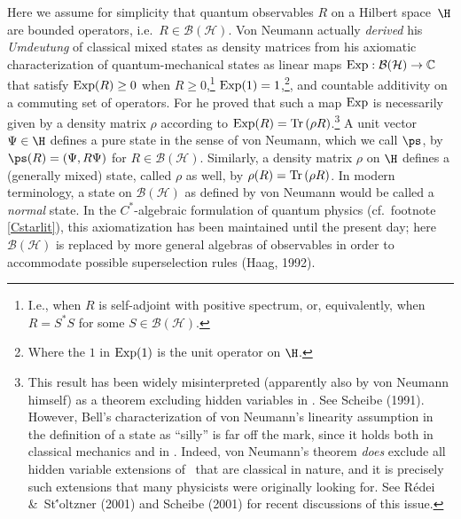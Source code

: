 \documentclass[12pt]{article}
\newcommand{\ca}{$C^*$-algebra} \newcommand{\jba}{JB-algebra}
\newcommand{\Hs}{Hilbert space} \newcommand{\Bs}{Banach space}
\newcommand{\raw}{\rightarrow} \newcommand{\rat}{\mapsto}
\newcommand{\Tr}{\mbox{\rm Tr}\,} \newcommand{\Ad}{{\rm Ad}}
\newcommand{\BH}{\mathcal{B}({\mathcal H})} \newcommand{\diri}{\int^{\oplus}}
\newcommand{\Exp}{{\rm Exp}}
\newcommand{\rh}{\rho} \newcommand{\sg}{\sigma}
\newcommand{\C}{{\mathbb C}} \newcommand{\D}{{\mathbb D}}
\begin{document}
Here we  assume for simplicity that 
 quantum observables $R$ on a \Hs\ $\H$ are bounded operators, i.e.\ $R\in\BH$. Von Neumann actually {\it derived} his {\it Umdeutung} of classical mixed states as density matrices from his axiomatic characterization of quantum-mechanical states as  linear maps $\Exp: \BH\raw \C$  that satisfy $\Exp(R)\geq 0$ when $R\geq 0$,\footnote{I.e., when $R$ is self-adjoint with positive spectrum, or, equivalently, when $R=S^*S$ for some $S\in \BH$.} $\Exp(1)=1$,\footnote{Where the $1$ in $\Exp(1)$ is the unit operator on $\H$.},  and countable additivity on a commuting set of operators. For he proved that such a map $\Exp$ is necessarily given by a density matrix $\rh$ according to $\Exp(R)=\Tr(\rh R)$.\footnote{This result has been widely misinterpreted (apparently also by von Neumann himself) as a theorem excluding hidden variables in \qm. See Scheibe (1991).  However, Bell's characterization of von Neumann's linearity assumption in the definition of a state as ``silly'' is far off the mark, since it holds  both in classical mechanics and in \qm.  Indeed, von Neumann's theorem {\it does} exclude all hidden variable extensions of \qm\ that are classical in nature, and it is precisely such extensions that many physicists were originally looking for. See R\'{e}dei \&\ St\''{o}ltzner (2001) and Scheibe (2001) 
for  recent discussions of this issue.} 
A unit vector $\Psi\in\H$ defines a pure state in the sense of von Neumann, which we call $\ps$, by $\ps(R)=(\Psi,R\Psi)$ for $R\in\BH$. Similarly, a density matrix $\rh$ on $\H$ defines a (generally mixed) state, called $\rh$ as well, by $\rh(R)=\Tr(\rh R)$.
In modern terminology, a state on $\BH$ as defined by von Neumann would be called a {\it normal} state.
 In the \ca ic formulation of quantum physics (cf.\ footnote  \ref{Cstarlit}), this axiomatization has been maintained until the present day; here $\BH$ is replaced by more general algebras of observables in order to accommodate possible superselection rules (Haag, 1992).  
\end{document}
